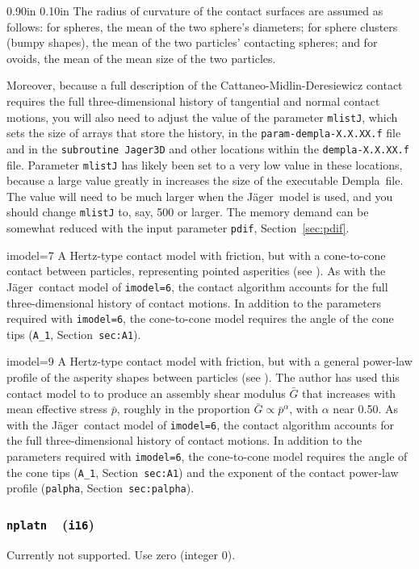 \documentclass[letterpaper,11pt]{article}
\newcommand{\Var}[2]{\texttt{#1}\ \  (\texttt{#2})}
\newlength{\Labelwidth}
\newcommand{\Entrylabel}[1]{\makebox[\Labelwidth][r]{\texttt{#1}}}
\newenvironment{Options}
{\begin{list}{}{%
\renewcommand{\makelabel}{\Entrylabel}%
\setlength{\leftmargin} {0.90in}%
\setlength{\rightmargin}{0.00in}%
\setlength{\labelsep}   {0.10in}%
\setlength{\labelwidth} {\Labelwidth}%
}}
{\end{list}}
\begin{document}
\begin{Options}
The radius of curvature of the contact surfaces are assumed
as follows: 
for spheres, the mean of the two sphere's diameters;
for sphere clusters (bumpy shapes), the mean
of the two particles' contacting spheres;
and for ovoids, the mean of the mean size of the
two particles.
\par
Moreover, because a full description of the
Cattaneo-Midlin-Deresiewicz contact requires the full
three-dimensional history
of tangential and normal contact motions,
you will also need to adjust the 
value of the parameter \texttt{mlistJ}, which
sets the size of arrays that store the history, in the
\texttt{param-dempla-X.X.XX.f} file
and in the \texttt{subroutine Jager3D} and other locations within
the \texttt{dempla-X.X.XX.f} file.
Parameter \texttt{mlistJ} has likely been set to a very low value in these
locations, because a large value greatly in increases the
size of the executable Dempla\ file. 
The value will need to be much larger when the J\"{a}ger\ model
is used, and you should change  \texttt{mlistJ} to, say, 500 or larger.
The memory demand can be somewhat reduced with the input parameter
\texttt{pdif}, Section~\ref{sec:pdif}.
%
\item[imodel=7]
A Hertz-type contact model with friction, but with
a cone-to-cone contact between particles, representing
pointed asperities 
(see \citep{Kuhn:2014c}).
As with the
J\"{a}ger\ contact model of \texttt{imodel=6},
the contact algorithm accounts for the full three-dimensional
history of contact motions.
In addition to the parameters required with \texttt{imodel=6},
the cone-to-cone model requires the angle of the cone tips
(\texttt{A\_1}, Section~\texttt{sec:A1}).
%
\item[imodel=9]
A Hertz-type contact model with friction, but with
a general power-law profile of
the asperity shapes between particles
(see \citep{Kuhn:2014c}).
The author has used this contact model to
to produce an assembly shear modulus $\bar{G}$ that
increases with mean effective stress $\bar{p}$,
roughly in the proportion $\bar{G}\propto\bar{p}^{\alpha}$,
with $\alpha$ near 0.50. 
As with the
J\"{a}ger\ contact model of \texttt{imodel=6},
the contact algorithm accounts for the full three-dimensional
history of contact motions.
In addition to the parameters required with \texttt{imodel=6},
the cone-to-cone model requires the angle of the cone tips
(\texttt{A\_1}, Section~\texttt{sec:A1})
and the exponent of the contact power-law profile
(\texttt{palpha}, Section~\texttt{sec:palpha}).
\end{Options}
%
\subsubsection[\texttt{nplatn}]{\Var{nplatn}{i16}}\label{sec:nplatn}
Currently not supported.
Use zero (integer 0).
%
\end{document}
